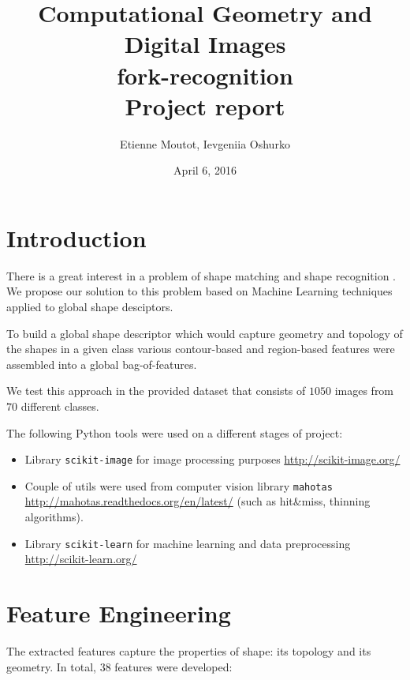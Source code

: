 \documentclass[12pt]{article}
\begin{document}
\title{
Computational Geometry and Digital Images \\
\textbf{fork-recognition}\\
Project report
}

\author{Etienne Moutot, Ievgeniia Oshurko}
\date{April 6, 2016}
\maketitle


\section{Introduction}  

There is a great interest in a problem of shape matching and shape recognition \cite{Zhang20041}. We propose our solution to this problem based on Machine Learning techniques applied to global shape desciptors.

To build a global shape descriptor which would capture geometry and topology of the shapes in a given class various contour-based and region-based features were assembled into a global bag-of-features.

We test this approach in the provided dataset that consists of $1 050$ images from $70$ different classes.

The following Python tools were used on a different stages of project:
\begin{itemize}
\item Library \texttt{scikit-image} for image processing purposes \url{http://scikit-image.org/}
\item Couple of utils were used from computer vision library \texttt{mahotas} \url{http://mahotas.readthedocs.org/en/latest/} (such as hit\&miss, thinning algorithms).
\item Library \texttt{scikit-learn} for machine learning and data preprocessing \url{http://scikit-learn.org/}
\end{itemize}


\section{Feature Engineering}

The extracted features capture the properties of shape: its topology and its geometry. In total, 38 features were developed:
\end{document}
